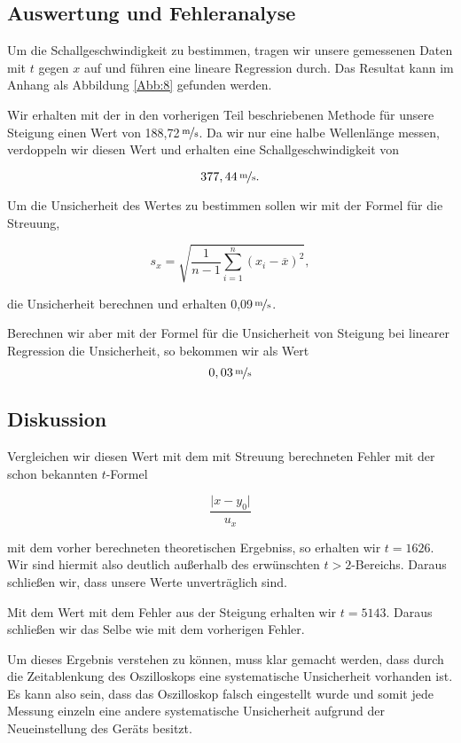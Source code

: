 \documentclass[11pt,a4paper]{article}
\begin{document}
\subsection{Auswertung und Fehleranalyse}

Um die Schallgeschwindigkeit zu bestimmen, tragen wir unsere gemessenen Daten mit $t$ gegen $x$ auf und f\"uhren eine lineare Regression durch.  Das Resultat kann im Anhang als Abbildung \ref{Abb:8} gefunden werden.

Wir erhalten mit der in den vorherigen Teil beschriebenen Methode f\"ur unsere Steigung einen Wert von 188,72\,$\nicefrac{\mathrm{m}}{\mathrm{s}}$. Da wir nur eine halbe Wellenl\"ange messen, verdoppeln wir diesen Wert und erhalten eine Schallgeschwindigkeit von 

\[
377,44\,\nicefrac{\mathrm{m}}{\mathrm{s}}.
\]

Um die Unsicherheit des Wertes zu bestimmen sollen wir mit der Formel f\"ur die Streuung,

\[s_x=\sqrt{\frac{1}{n-1}\sum_{i=1}^n(x_i-\overline{x})^2},\]

 die Unsicherheit berechnen und erhalten 0,09\,$\nicefrac{\mathrm{m}}{\mathrm{s}}$.

Berechnen wir aber mit der Formel f\"ur die Unsicherheit von Steigung bei linearer Regression die Unsicherheit, so bekommen wir als Wert
\[
0,03\,\nicefrac{\mathrm{m}}{\mathrm{s}}
\]

\subsection{Diskussion}

Vergleichen wir diesen Wert mit dem mit Streuung berechneten Fehler mit der schon bekannten $t$-Formel

\[\frac{\vert x-y_0\vert}{u_x}\]

mit dem vorher berechneten theoretischen Ergebniss, so erhalten wir $t=1626$. Wir sind hiermit also deutlich au\ss erhalb des erw\"unschten $t>2$-Bereichs. Daraus schlie\ss en wir, dass unsere Werte unvertr\"aglich sind.

Mit dem Wert mit dem Fehler aus der Steigung erhalten wir $t=5143$. Daraus schlie\ss en wir das Selbe wie mit dem vorherigen Fehler.

Um dieses Ergebnis verstehen zu k\"onnen, muss klar gemacht werden, dass durch die Zeitablenkung des Oszilloskops eine systematische Unsicherheit vorhanden ist. Es kann also sein, dass das Oszilloskop falsch eingestellt wurde und somit jede Messung einzeln eine andere systematische Unsicherheit aufgrund der Neueinstellung des Ger\"ats besitzt.
\end{document}
